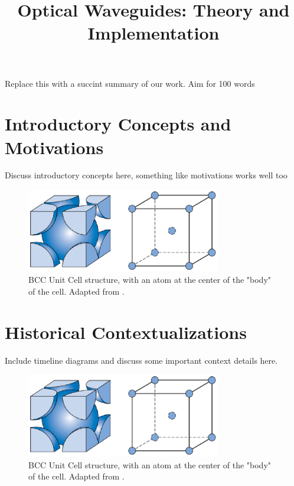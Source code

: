 \documentclass[10pt]{article}
\begin{document}
\noindent



\title{Optical Waveguides: Theory and Implementation}




\maketitle


\abstract
Replace this with a succint summary of our work. Aim for 100 words  

\section{Introductory Concepts and Motivations}

Discuss introductory concepts here, something like motivations works well too


\begin{figure}[h]
    \centering
    \includegraphics[width=8.5cm]{fig1.eps}
    \caption{\label{tab1}BCC Unit Cell structure, with an atom at the center of the "body" of the cell. Adapted from \cite{ref01}.} 
    \end{figure}

\section{Historical Contextualizations}

Include timeline diagrams and discuss some important context details here.


\begin{figure}[h]
    \centering
    \includegraphics[width=8.5cm]{fig1.eps}
    \caption{\label{tab1}BCC Unit Cell structure, with an atom at the center of the "body" of the cell. Adapted from \cite{ref01}.} 
    \end{figure}
\end{document}
